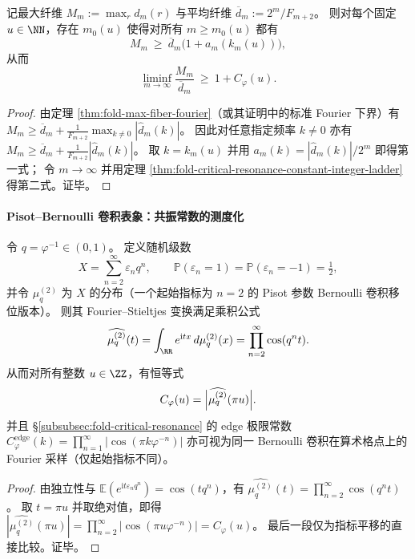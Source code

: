 \begin{corollary}\label{cor:fold-maxfiber-bias-resonance-ladder}
记最大纤维 \(M_m:=\max_r d_m(r)\) 与平均纤维 \(\overline d_m:=2^m/F_{m+2}\)。
则对每个固定 \(u\in\NN\)，存在 \(m_0(u)\) 使得对所有 \(m\ge m_0(u)\) 都有
\[
M_m\ \ge\ \overline d_m\bigl(1+a_m(k_m(u))\bigr),
\]
从而
\[
\liminf_{m\to\infty}\frac{M_m}{\overline d_m}\ \ge\ 1+C_\varphi(u).
\]
\end{corollary}

\begin{proof}
由定理 \ref{thm:fold-max-fiber-fourier}（或其证明中的标准 Fourier 下界）有
\(
M_m\ge \overline d_m+\frac{1}{F_{m+2}}\max_{k\ne 0}|\widehat d_m(k)|
\)。
因此对任意指定频率 \(k\ne 0\) 亦有
\(
M_m\ge \overline d_m+\frac{1}{F_{m+2}}|\widehat d_m(k)|
\)。
取 \(k=k_m(u)\) 并用 \(a_m(k)=|\widehat d_m(k)|/2^m\) 即得第一式；
令 \(m\to\infty\) 并用定理 \ref{thm:fold-critical-resonance-constant-integer-ladder} 得第二式。证毕。
\end{proof}

\paragraph{Pisot--Bernoulli 卷积表象：共振常数的测度化}
\begin{theorem}\label{thm:fold-pisot-bernoulli-convolution-representation}
令 \(q=\varphi^{-1}\in(0,1)\)。
定义随机级数
\[
X=\sum_{n=2}^{\infty}\varepsilon_n q^n,
\qquad
\mathbb{P}(\varepsilon_n=1)=\mathbb{P}(\varepsilon_n=-1)=\tfrac12,
\]
并令 \(\mu_q^{(2)}\) 为 \(X\) 的分布（一个起始指标为 \(n=2\) 的 Pisot 参数 Bernoulli 卷积移位版本）。
则其 Fourier--Stieltjes 变换满足乘积公式
\[
\widehat{\mu_q^{(2)}}(t)
=\int_{\RR}e^{\mathrm{i}tx}\,d\mu_q^{(2)}(x)
=\prod_{n=2}^{\infty}\cos(q^n t).
\]
从而对所有整数 \(u\in\ZZ\)，有恒等式
\[
C_\varphi(u)=\Bigl|\widehat{\mu_q^{(2)}}(\pi u)\Bigr|.
\]
并且 \S\ref{subsubsec:fold-critical-resonance} 的 edge 极限常数
\(
C_\varphi^{\mathrm{edge}}(k)=\prod_{n=1}^{\infty}|\cos(\pi k\varphi^{-n})|
\)
亦可视为同一 Bernoulli 卷积在算术格点上的 Fourier 采样（仅起始指标不同）。
\end{theorem}

\begin{proof}
由独立性与 \(\mathbb{E}(e^{\mathrm{i}t\varepsilon_n q^n})=\cos(tq^n)\)，有
\(
\widehat{\mu_q^{(2)}}(t)=\prod_{n=2}^{\infty}\cos(q^n t)
\)。
取 \(t=\pi u\) 并取绝对值，即得
\(
|\widehat{\mu_q^{(2)}}(\pi u)|=\prod_{n=2}^{\infty}|\cos(\pi u\varphi^{-n})|=C_\varphi(u)
\)。
最后一段仅为指标平移的直接比较。证毕。
\end{proof}

